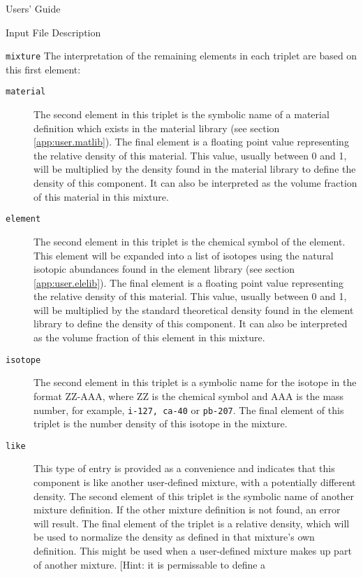 \begin{chapter}{Users' Guide\label{app:user.guide}}
\begin{section}{Input File Description\label{app:user.input}}
\begin{subsection}{\texttt{mixture}\label{app:user.input.mix}}
      The interpretation of the remaining elements in each triplet are
      based on this first element:
      \begin{description}
      \item[\texttt{material}] The second element in this triplet is
        the symbolic name of a material definition which exists in the
        material library (see section \ref{app:user.matlib}).  The
        final element is a floating point value representing the
        relative density of this material.  This value, usually
        between 0 and 1, will be multiplied by the density found in
        the material library to define the density of this component.
        It can also be interpreted as the volume fraction of this
        material in this mixture.
      \item[\texttt{element}] The second element in this triplet is
        the chemical symbol of the element.  This element will be
        expanded into a list of isotopes using the natural isotopic
        abundances found in the element library (see section
        \ref{app:user.elelib}).  The final element is a floating
        point value representing the relative density of this
        material.  This value, usually between 0 and 1, will be
        multiplied by the standard theoretical density found in the
        element library to define the density of this component.  It
        can also be interpreted as the volume fraction of this
        element in this mixture.
      \item[\texttt{isotope}] The second element in this triplet is a
        symbolic name for the isotope in the format ZZ-AAA, where ZZ
        is the chemical symbol and AAA is the mass number, for
        example, \texttt{i-127, ca-40} or \texttt{pb-207}.  The final
        element of this triplet is the number density of this isotope
        in the mixture.
      \item[\texttt{like}] This type of entry is provided as a
        convenience and indicates that this component is like another
        user-defined mixture, with a potentially different density.
        The second element of this triplet is the symbolic name of
        another mixture definition.  If the other mixture definition
        is not found, an error will result.  The final element of the
        triplet is a relative density, which will be used to normalize
        the density as defined in that mixture's own definition.
        This might be used when a user-defined mixture makes up part
        of another mixture. [Hint: it is permissable to define a

\end{description}
\end{subsection}
\end{section}
\end{chapter}
